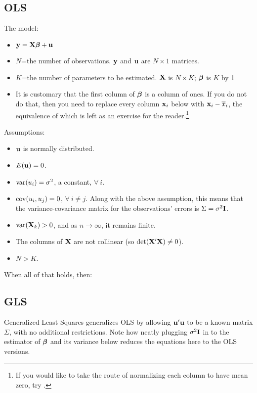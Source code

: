 \subsection{OLS}\label{olsdef}
The model: 
\begin{itemize}
\item ${\bf y}={\bf X}{\mbox{\boldmath$\beta$}} + {\bf u}$
\item $N$=the number of observations. ${\bf y}$ and ${\bf u}$ are $N \times 1$
matrices.
\item $K$=the number of parameters to be estimated. ${\bf X}$ is $N \times K$;
${\mbox{\boldmath$\beta$}}$ is $K$ by 1
\item It is customary that the first column of ${\mbox{\boldmath$\beta$}}$ is a column of
ones. If you do not do that, then you need to replace every column ${\bf x}_i$ below
with ${\bf x}_i-\overline x_i$, the equivalence of which is left as an exercise
for the reader.\footnote{If you would like to take the route of
normalizing each column to have mean zero, try
.}
\end{itemize}

Assumptions:

\begin{itemize}
\item ${\bf u}$ is normally distributed.
\item $E({\bf u}) = 0$.
\item $\operatorname{var}(u_i) = \sigma^2$, a constant, $\forall\ i$.
\item $\operatorname{cov}(u_i, u_j) = 0$, $\forall\ i\neq j$. Along with the above
assumption, this
means that the variance-covariance matrix for the observations' errors is
$\Sigma =
\sigma^2{\bf I}$.
\item $\operatorname{var}({\bf X}_k)>0$, and as $n\to\infty$, it remains finite.
\item The columns of ${\bf X}$ are not collinear (so $\det({\bf X}'{\bf X})\neq 0$).
\item $N>K$.
\end{itemize}

When all of that holds, then:


\subsection{GLS} \label{GLS}
Generalized Least Squares generalizes OLS by allowing ${\bf u}'{\bf u}$ to be a
known matrix $\Sigma$, with no additional restrictions.
Note how neatly plugging $\sigma^2{\bf I}$ in to the
estimator of ${\mbox{\boldmath$\beta$}}$ and its variance below reduces the equations here to the OLS
versions.

